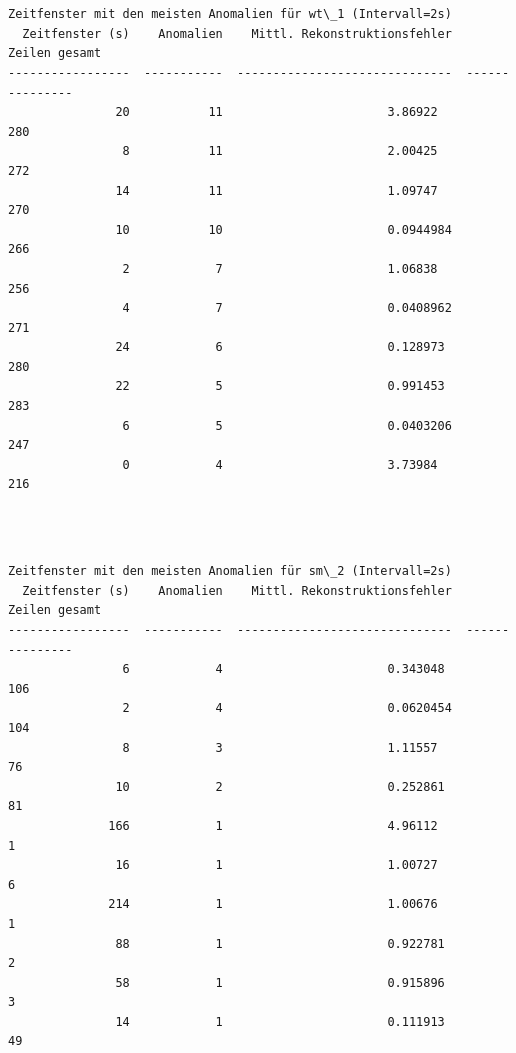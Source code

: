 \documentclass[11pt]{article}
\begin{document}
    \begin{center}
    \end{center}
    { \hspace*{\fill} \\}
    
    \begin{Verbatim}[commandchars=\\\{\}]

Zeitfenster mit den meisten Anomalien für wt\_1 (Intervall=2s)
  Zeitfenster (s)    Anomalien    Mittl. Rekonstruktionsfehler    Zeilen gesamt
-----------------  -----------  ------------------------------  ---------------
               20           11                       3.86922                280
                8           11                       2.00425                272
               14           11                       1.09747                270
               10           10                       0.0944984              266
                2            7                       1.06838                256
                4            7                       0.0408962              271
               24            6                       0.128973               280
               22            5                       0.991453               283
                6            5                       0.0403206              247
                0            4                       3.73984                216
    \end{Verbatim}

    \begin{center}
    \end{center}
    { \hspace*{\fill} \\}
    
    \begin{Verbatim}[commandchars=\\\{\}]

Zeitfenster mit den meisten Anomalien für sm\_2 (Intervall=2s)
  Zeitfenster (s)    Anomalien    Mittl. Rekonstruktionsfehler    Zeilen gesamt
-----------------  -----------  ------------------------------  ---------------
                6            4                       0.343048               106
                2            4                       0.0620454              104
                8            3                       1.11557                 76
               10            2                       0.252861                81
              166            1                       4.96112                  1
               16            1                       1.00727                  6
              214            1                       1.00676                  1
               88            1                       0.922781                 2
               58            1                       0.915896                 3
               14            1                       0.111913                49
    \end{Verbatim}
\end{document}
